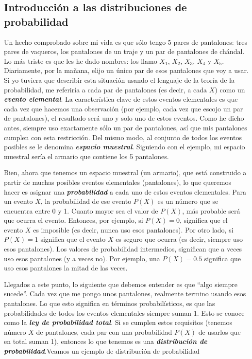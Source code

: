 \documentclass[spanish,]{book}
\begin{document}
\subsection{Introducción a las distribuciones de
probabilidad}\label{introduccion-a-las-distribuciones-de-probabilidad}

Un hecho comprobado sobre mi vida es que sólo tengo 5 pares de
pantalones: tres pares de vaqueros, los pantalones de un traje y un par
de pantalones de chándal. Lo más triste es que les he dado nombres: los
llamo \(X_1\), \(X_2\), \(X_3\), \(X_4\) y \(X_5\). Diariamente, por la
mañana, elijo un único par de esos pantalones que voy a usar. Si yo
tuviera que describir esta situación usando el lenguaje de la teoría de
la probabilidad, me referiría a cada par de pantalones (es decir, a cada
\(X\)) como un \textbf{\emph{evento elemental}}. La característica clave
de estos eventos elementales es que cada vez que hacemos una observación
(por ejemplo, cada vez que escojo un par de pantalones), el resultado
será uno y solo uno de estos eventos. Como he dicho antes, siempre uso
exactamente sólo un par de pantalones, así que mis pantalones cumplen
con esta restricción. Del mismo modo, al conjunto de todos los eventos
posibles se le denomina \textbf{\emph{espacio muestral}}. Siguiendo con
el ejemplo, mi espacio muestral sería el armario que contiene los 5
pantalones.

Bien, ahora que tenemos un espacio muestral (un armario), que está
construido a partir de muchas posibles eventos elementales (pantalones),
lo que queremos hacer es asignar una \textbf{\emph{probabilidad}} a cada
uno de estos eventos elementales. Para un evento \(X\), la probabilidad
de ese evento \(P(X)\) es un número que se encuentra entre 0 y 1. Cuanto
mayor sea el valor de \(P(X)\), más probable será que ocurra el evento.
Entonces, por ejemplo, si \(P(X) = 0\), significa que el evento \(X\) es
imposible (es decir, nunca uso esos pantalones). Por otro lado, si
\(P(X) = 1\) significa que el evento \(X\) es seguro que ocurra (es
decir, siempre uso esos pantalones). Los valores de probabilidad
intermedios, significan que a veces uso esos pantalones (y a veces no).
Por ejemplo, una \(P(X) = 0.5\) significa que uso esos pantalones la
mitad de las veces.

Llegados a este punto, lo siguiente que debemos entender es que ``algo
siempre sucede''. Cada vez que me pongo unos pantalones, realmente
termino usando esos pantalones. Lo que esto significa en términos
probabilísticos, es que las probabilidades de todos los eventos
elementales siempre suman 1. Esto se conoce como la \textbf{\emph{ley de
probabilidad total}}. Si se cumplen estos requisitos (tenemos número
\(X\) de pantalones, cada par con una probabilidad \(P(X)\) de usarlos
que en total suman 1), entonces lo que tenemos es una
\textbf{\emph{distribución de probabilidad}}.Veamos un ejemplo de
distribución de probabilidad
\end{document}
